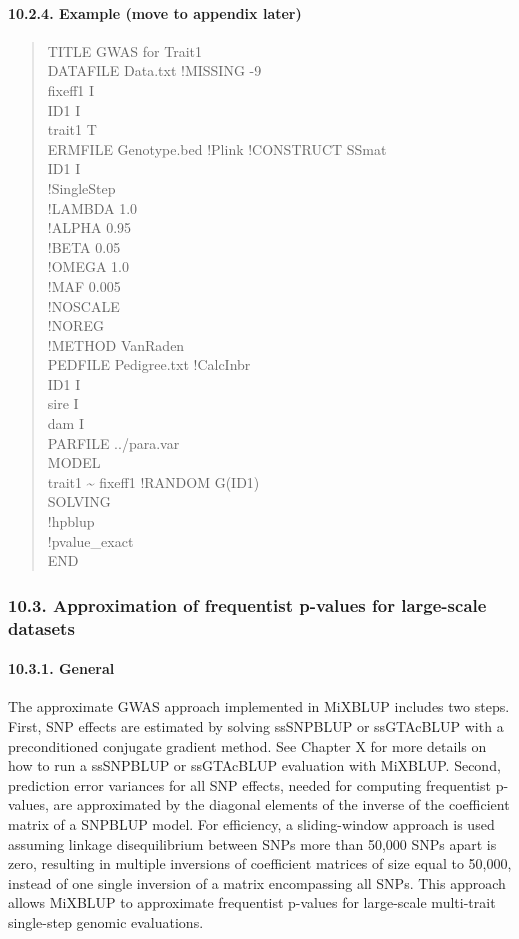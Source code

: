 \paragraph{10.2.4. Example (move to appendix later)}\label{MTGW07}

\begin{quote}
TITLE GWAS for Trait1\\
DATAFILE Data.txt !MISSING -9\\
fixeff1 I\\
ID1 I\\
trait1 T\\
ERMFILE Genotype.bed !Plink !CONSTRUCT SSmat\\
ID1 I\\
!SingleStep\\
!LAMBDA 1.0\\
!ALPHA 0.95\\
!BETA 0.05\\
!OMEGA 1.0\\
!MAF 0.005\\
!NOSCALE\\
!NOREG\\
!METHOD VanRaden\\
PEDFILE Pedigree.txt !CalcInbr\\
ID1 I\\
sire I\\
dam I\\
PARFILE ../para.var\\
MODEL\\
trait1 \textasciitilde{} fixeff1 !RANDOM G(ID1)\\
SOLVING\\
!hpblup\\
!pvalue\_exact\\
END
\end{quote}

\subsubsection{10.3. Approximation of frequentist p-values for
large-scale datasets}\label{MTGW08}

\paragraph{10.3.1. General}\label{MTGW09}

The approximate GWAS approach implemented in MiXBLUP includes two steps.
First, SNP effects are estimated by solving ssSNPBLUP or ssGTAcBLUP with
a preconditioned conjugate gradient method. See Chapter X for more
details on how to run a ssSNPBLUP or ssGTAcBLUP evaluation with MiXBLUP.
Second, prediction error variances for all SNP effects, needed for
computing frequentist p-values, are approximated by the diagonal
elements of the inverse of the coefficient matrix of a SNPBLUP model.
For efficiency, a sliding-window approach is used assuming linkage
disequilibrium between SNPs more than 50,000 SNPs apart is zero,
resulting in multiple inversions of coefficient matrices of size equal
to 50,000, instead of one single inversion of a matrix encompassing all
SNPs. This approach allows MiXBLUP to approximate frequentist p-values
for large-scale multi-trait single-step genomic evaluations.


